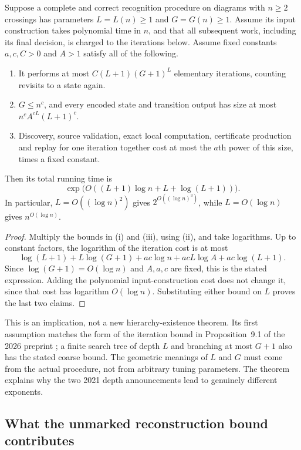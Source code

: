 \begin{theorem}
\label{thm:conditional-accounting}
Suppose a complete and correct recognition procedure on diagrams with
$n\geq2$ crossings has parameters $L=L(n)\geq1$ and $G=G(n)\geq1$.
Assume its input construction takes polynomial time in $n$, and that all
subsequent work, including its final decision, is charged to the iterations
below.
Assume fixed constants $a,c,C>0$ and $A>1$ satisfy all of the following.
\begin{enumerate}[label=(\roman*)]
\item It performs at most $C(L+1)(G+1)^L$ elementary iterations, counting
revisits to a state again.
\item $G\leq n^c$, and every encoded state and transition output has
size at most $n^c A^{cL}(L+1)^c$.
\item Discovery, source validation, exact local computation, certificate
production and replay for one iteration together cost at most the $a$th
power of this size, times a fixed constant.
\end{enumerate}
Then its total running time is
\[
 \exp\!\bigl(O((L+1)\log n+L+\log(L+1))\bigr).
\]
In particular, $L=O((\log n)^2)$ gives
$2^{O((\log n)^3)}$, while $L=O(\log n)$ gives
$n^{O(\log n)}$.
\end{theorem}
\begin{proof}
Multiply the bounds in (i) and (iii), using (ii), and take logarithms.
Up to constant factors, the logarithm of the iteration cost is at most
\[
 \log(L+1)+L\log(G+1)
 +ac\log n+acL\log A+ac\log(L+1).
\]
Since $\log(G+1)=O(\log n)$ and $A,a,c$ are fixed, this is the stated
expression.  Adding the polynomial input-construction cost does not
change it, since that cost has logarithm $O(\log n)$.  Substituting either
bound on $L$ proves the last two claims.
\end{proof}

This is an implication, not a new hierarchy-existence theorem.  Its first
assumption matches the form of the iteration bound in Proposition~9.1 of
the 2026 preprint \cite{Lackenby2026Hierarchies}; a finite search tree of
depth $L$ and branching at most $G+1$ also has the stated coarse bound.
The geometric meanings of $L$ and $G$ must come from the actual procedure,
not from arbitrary tuning parameters.  The theorem explains why the two
2021 depth announcements lead to genuinely different exponents.

\subsection{What the unmarked reconstruction bound contributes}

